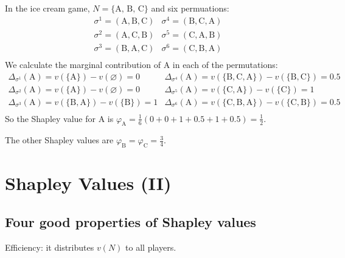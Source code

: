 \documentclass[12pt,letterpaper]{report}
\begin{document}
\begin{ex}
  In the ice cream game, $N = \{\text{A, B, C}\}$ and six permuations:
  \[
    \renewcommand{\arraystretch}{1.2}
    \begin{array}{cc}
      \sigma^1 = (\text{A}, \text{B}, \text{C})
      & \sigma^4 = (\text{B}, \text{C}, \text{A}) \\
      \sigma^2 = (\text{A}, \text{C}, \text{B})
      & \sigma^5 = (\text{C}, \text{A}, \text{B}) \\
      \sigma^3 = (\text{B}, \text{A}, \text{C})
      & \sigma^6 = (\text{C}, \text{B}, \text{A}) \\
    \end{array}
  \]
  We calculate the marginal contribution of A in each of the permutations:
  \[
    \renewcommand{\arraystretch}{1.2}
    \begin{array}{ll}
      \Delta_{\sigma^1}(\text{A}) = v(\{\text{A}\}) - v(\varnothing) = 0
      & \Delta_{\sigma^4}(\text{A}) = v(\{\text{B}, \text{C}, \text{A}\})
        - v(\{\text{B}, \text{C}\}) = 0.5 \\
      \Delta_{\sigma^2}(\text{A}) = v(\{\text{A}\}) - v(\varnothing) = 0
      & \Delta_{\sigma^5}(\text{A}) = v(\{\text{C}, \text{A}\}) - v(\{\text{C}\}) = 1 \\
      \Delta_{\sigma^3}(\text{A}) = v(\{\text{B}, \text{A}\}) - v(\{\text{B}\}) = 1
      & \Delta_{\sigma^6}(\text{A}) = v(\{\text{C}, \text{B}, \text{A}\})
        - v(\{\text{C}, \text{B}\}) = 0.5 \\
    \end{array}
  \]
  So the Shapley value for A is
  $\varphi_\text{A} = \frac{1}{6}(0 + 0 + 1 + 0.5 + 1 + 0.5) = \frac{1}{2}$.

  The other Shapley values are $\varphi_\text{B} = \varphi_\text{C} = \frac{3}{4}$.
\end{ex}

\section{Shapley Values (II)}

\subsection{Four good properties of Shapley values}

\begin{enumcase}
  \item Efficiency: it distributes $v(N)$ to all players.
\end{enumcase}
\end{document}
